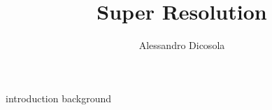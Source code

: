 \documentclass{article}
\author{Alessandro Dicosola}
\title{Super Resolution}
\begin{document}
\maketitle
\tableofcontents

{introduction}
{background}



\clearpage


\end{document}
